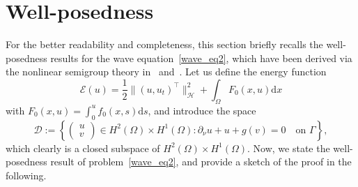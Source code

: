 \documentclass{elsarticle}
\begin{document}
\section{Well-posedness}
\label{sec:evolution}
For the better readability and completeness, this section briefly recalls the well-posedness results for the wave equation~\eqref{wave_eq2}, which have been derived via the nonlinear semigroup theory in~\cite[Theorem 2.1]{CEL2002} and~\cite[Theorem 1]{rodrigues2022}.  
Let us define the energy function
\[
	\mathcal{E}(u) = \frac{1}{2}\|(u, u_t)^{\top}\|^2_{\mathcal{H}} + \int_{\Omega}F_0(x, u)\mathrm{d}x
\]
with $F_0(x, u) = \int_{0}^{u}f_0(x, s)\mathrm{d}s$, and introduce the space
\begin{equation*}
\mathcal{D} :=
 \left\{
\left(
\begin{array}{c}
u \\
v
\end{array}
\right)
\in H^2(\Omega)\times H^1(\Omega): \partial_{\nu} u + u +  g(v) = 0\quad  \textrm{on $\Gamma$}
\right\},
\end{equation*}
which clearly is a closed subspace of $H^{2}(\Omega)\times H^{1}(\Omega)$.
Now, we state the well-posedness result of problem~\eqref{wave_eq2}, and provide a sketch of the proof in the following.
\end{document}
